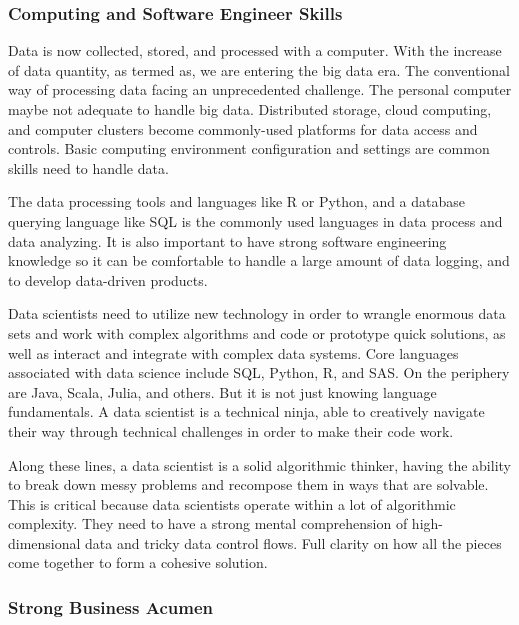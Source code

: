 \documentclass[
]{book}
\begin{document}
\hypertarget{computing-and-software-engineer-skills}{%
\subsubsection*{Computing and Software Engineer Skills}\label{computing-and-software-engineer-skills}}


Data is now collected, stored, and processed with a computer. With the increase of data quantity, as termed as, we are entering the big data era. The conventional way of processing data facing an unprecedented challenge. The personal computer maybe not adequate to handle big data. Distributed storage, cloud computing, and computer clusters become commonly-used platforms for data access and controls. Basic computing environment configuration and settings are common skills need to handle data.

The data processing tools and languages like R or Python, and a database querying language like SQL is the commonly used languages in data process and data analyzing. It is also important to have strong software engineering knowledge so it can be comfortable to handle a large amount of data logging, and to develop data-driven products.

Data scientists need to utilize new technology in order to wrangle enormous data sets and work with complex algorithms and code or prototype quick solutions, as well as interact and integrate with complex data systems. Core languages associated with data science include SQL, Python, R, and SAS. On the periphery are Java, Scala, Julia, and others. But it is not just knowing language fundamentals. A data scientist is a technical ninja, able to creatively navigate their way through technical challenges in order to make their code work.

Along these lines, a data scientist is a solid algorithmic thinker, having the ability to break down messy problems and recompose them in ways that are solvable. This is critical because data scientists operate within a lot of algorithmic complexity. They need to have a strong mental comprehension of high-dimensional data and tricky data control flows. Full clarity on how all the pieces come together to form a cohesive solution.

\hypertarget{strong-business-acumen}{%
\subsubsection*{Strong Business Acumen}\label{strong-business-acumen}}
\end{document}
